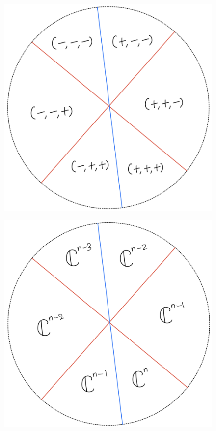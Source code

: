 \begin{figure}[H]
    \centering
    \includegraphics[scale = 0.95]{diagrams/lemma4/24.png}
    \caption{}
    \label{fig:your-label}
\end{figure}
\begin{figure}[H]
    \centering
    \includegraphics[scale = 0.95]{diagrams/cobord'4/25.png}
    \caption{}
    \label{fig:your-label}
\end{figure}
